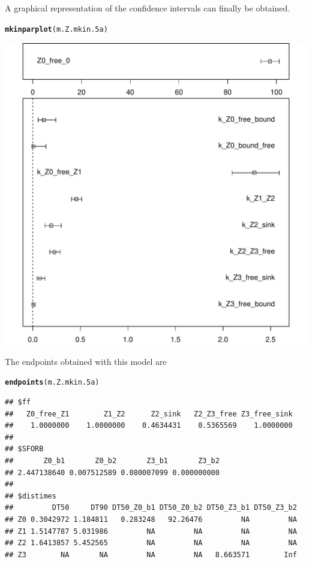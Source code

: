 \documentclass[12pt,a4paper]{article}\usepackage[]{graphicx}\usepackage[]{color}
\makeatletter
\def\maxwidth{ %
  \ifdim\Gin@nat@width>\linewidth
    \linewidth
  \else
    \Gin@nat@width
  \fi
}
\newcommand{\hlstd}[1]{\textcolor[rgb]{0.345,0.345,0.345}{#1}}%
\newcommand{\hlkwd}[1]{\textcolor[rgb]{0.737,0.353,0.396}{\textbf{#1}}}%
\newenvironment{kframe}{%
 \def\at@end@of@kframe{}%
 \ifinner\ifhmode%
  \def\at@end@of@kframe{\end{minipage}}%
  \begin{minipage}{\columnwidth}%
 \fi\fi%
 \def\FrameCommand##1{\hskip\@totalleftmargin \hskip-\fboxsep
 \colorbox{shadecolor}{##1}\hskip-\fboxsep
     \hskip-\linewidth \hskip-\@totalleftmargin \hskip\columnwidth}%
 \MakeFramed {\advance\hsize-\width
   \@totalleftmargin\z@ \linewidth\hsize
   \@setminipage}}%
 {\par\unskip\endMakeFramed%
 \at@end@of@kframe}
\newenvironment{knitrout}{}{} %
\makeatother
\begin{document}
A graphical representation of the confidence intervals can finally be obtained.

\begin{knitrout}
\color{fgcolor}\begin{kframe}
\begin{alltt}
\hlkwd{mkinparplot}\hlstd{(m.Z.mkin.5a)}
\end{alltt}
\end{kframe}
\includegraphics[width=\maxwidth]{figure/FOCUS_2006_Z_fits_11b-1} 

\end{knitrout}

The endpoints obtained with this model are

\begin{knitrout}
\color{fgcolor}\begin{kframe}
\begin{alltt}
\hlkwd{endpoints}\hlstd{(m.Z.mkin.5a)}
\end{alltt}
\begin{verbatim}
## $ff
##   Z0_free_Z1        Z1_Z2      Z2_sink   Z2_Z3_free Z3_free_sink 
##    1.0000000    1.0000000    0.4634431    0.5365569    1.0000000 
## 
## $SFORB
##       Z0_b1       Z0_b2       Z3_b1       Z3_b2 
## 2.447138640 0.007512589 0.080007099 0.000000000 
## 
## $distimes
##         DT50     DT90 DT50_Z0_b1 DT50_Z0_b2 DT50_Z3_b1 DT50_Z3_b2
## Z0 0.3042972 1.184811   0.283248   92.26476         NA         NA
## Z1 1.5147787 5.031986         NA         NA         NA         NA
## Z2 1.6413857 5.452565         NA         NA         NA         NA
## Z3        NA       NA         NA         NA   8.663571        Inf
\end{verbatim}
\end{kframe}
\end{knitrout}
\end{document}

